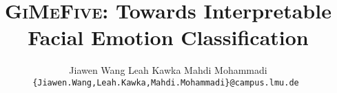 \documentclass[10pt,twocolumn,letterpaper]{article}
\title{\textsc{GiMeFive}: Towards Interpretable Facial Emotion Classification}
\author{
Jiawen Wang
\qquad
Leah Kawka
\qquad
Mahdi Mohammadi \\
\tt\small\{Jiawen.Wang,Leah.Kawka,Mahdi.Mohammadi\}@campus.lmu.de
}
\begin{document}
\maketitle
    

 

{
    \small
    
    
}
\end{document}
